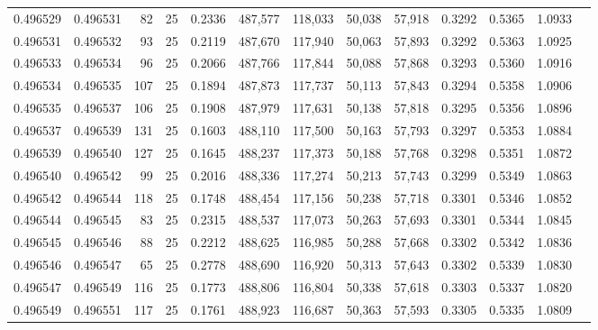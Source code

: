 \begin{tabular}{rrrrrrrrrrrrr}
0.496529 & 0.496531 &    82 &  25 &                                     0.2336 & 487,577 & 118,033 &  50,038 &  57,918 & 0.3292 & 0.5365 & 1.0933 \\
0.496531 & 0.496532 &    93 &  25 &                                     0.2119 & 487,670 & 117,940 &  50,063 &  57,893 & 0.3292 & 0.5363 & 1.0925 \\
0.496533 & 0.496534 &    96 &  25 &                                     0.2066 & 487,766 & 117,844 &  50,088 &  57,868 & 0.3293 & 0.5360 & 1.0916 \\
0.496534 & 0.496535 &   107 &  25 &                                     0.1894 & 487,873 & 117,737 &  50,113 &  57,843 & 0.3294 & 0.5358 & 1.0906 \\
0.496535 & 0.496537 &   106 &  25 &                                     0.1908 & 487,979 & 117,631 &  50,138 &  57,818 & 0.3295 & 0.5356 & 1.0896 \\
0.496537 & 0.496539 &   131 &  25 &                                     0.1603 & 488,110 & 117,500 &  50,163 &  57,793 & 0.3297 & 0.5353 & 1.0884 \\
0.496539 & 0.496540 &   127 &  25 &                                     0.1645 & 488,237 & 117,373 &  50,188 &  57,768 & 0.3298 & 0.5351 & 1.0872 \\
0.496540 & 0.496542 &    99 &  25 &                                     0.2016 & 488,336 & 117,274 &  50,213 &  57,743 & 0.3299 & 0.5349 & 1.0863 \\
0.496542 & 0.496544 &   118 &  25 &                                     0.1748 & 488,454 & 117,156 &  50,238 &  57,718 & 0.3301 & 0.5346 & 1.0852 \\
0.496544 & 0.496545 &    83 &  25 &                                     0.2315 & 488,537 & 117,073 &  50,263 &  57,693 & 0.3301 & 0.5344 & 1.0845 \\
0.496545 & 0.496546 &    88 &  25 &                                     0.2212 & 488,625 & 116,985 &  50,288 &  57,668 & 0.3302 & 0.5342 & 1.0836 \\
0.496546 & 0.496547 &    65 &  25 &                                     0.2778 & 488,690 & 116,920 &  50,313 &  57,643 & 0.3302 & 0.5339 & 1.0830 \\
0.496547 & 0.496549 &   116 &  25 &                                     0.1773 & 488,806 & 116,804 &  50,338 &  57,618 & 0.3303 & 0.5337 & 1.0820 \\
0.496549 & 0.496551 &   117 &  25 &                                     0.1761 & 488,923 & 116,687 &  50,363 &  57,593 & 0.3305 & 0.5335 & 1.0809 \\

\end{tabular}
